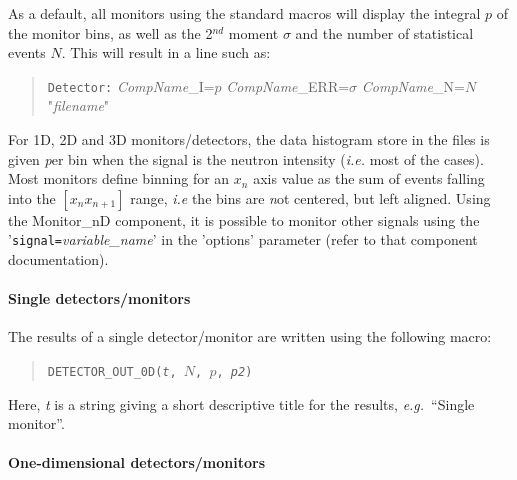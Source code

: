 As a default, all monitors using the standard macros will display the
integral $p$ of the monitor bins, as well as the 2$^{nd}$ moment $\sigma$
and the number of statistical events $N$. This will result in a line such as:

\begin{quote}
\verb+Detector:+ {\it CompName}\_I=$p$ {\it CompName}\_ERR=$\sigma$ {\it CompName}\_N=$N$ "{\it filename}"
\end{quote}

For 1D, 2D and 3D monitors/detectors, the data histogram store in the files
is given {\emph per bin} when the signal is the neutron intensity ({\it i.e.} most of the cases). Most monitors define binning for an $x_n$ axis value as the sum of events falling into the $[ x_n x_{n+1} ]$ range, {\it i.e} the bins are {\emph not} centered, but left aligned.
Using the Monitor\_nD component, it is possible to monitor other signals using the
'\verb+signal=+{\it variable\_name}' in the 'options' parameter (refer to that
component documentation).

\paragraph{Single detectors/monitors}
\label{s:DETECTOR_OUT}

The results of a single detector/monitor are written using the following
macro:
\begin{quote}
  \texttt{DETECTOR\_OUT\_0D({\it t}, $N$, $p$, {\it p2})}
\end{quote}
Here, \textit{t} is a string giving a short descriptive title for the
results, {\em e.g.}\ ``Single monitor''.


\paragraph{One-dimensional detectors/monitors}

